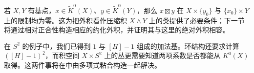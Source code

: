 \ProseParagraphBreak

若 \(X,Y\) 有基点，\(x\in\widetilde K^0(X)\)、\(y\in\widetilde K^0(Y)\)，那么 \(x\boxtimes y\) 在 \(X\times\{y_0\}\) 与 \(\{x_0\}\times Y\) 上的限制均为零。这为把外积看作压缩积 \(X\wedge Y\) 上的类提供了必要条件；下一节将通过相对正合性构造相应的约化外积，并证明其与这里的绝对外积相容。

在 \(S^2\) 的例子中，我们已得到 \(1\) 与 \([H]-1\) 组成的加法基。环结构还要求计算 \(([H]-1)^2\)，而积空间 \(X\times S^2\) 上的丛更需要知道两项系数是否都能从 \(K^0(X)\) 取得。这两件事将在中由多项式粘合构造一起解决。
